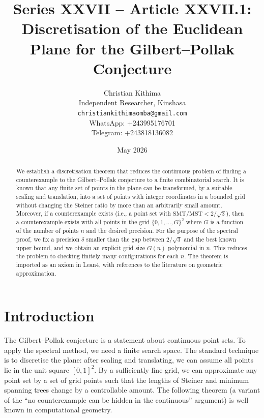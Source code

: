 \documentclass[11pt,a4paper]{article}
\title{Series XXVII – Article XXVII.1: Discretisation of the Euclidean Plane for the Gilbert–Pollak Conjecture}
\author{Christian Kithima \\
Independent Researcher, Kinshasa \\
\texttt{christiankithimaomba@gmail.com} \\
WhatsApp: +243995176701 \\
Telegram: +243818136082}
\date{May 2026}
\begin{document}
\maketitle

\begin{abstract}
We establish a discretisation theorem that reduces the continuous problem of finding a counterexample to the Gilbert–Pollak conjecture to a finite combinatorial search. It is known that any finite set of points in the plane can be transformed, by a suitable scaling and translation, into a set of points with integer coordinates in a bounded grid without changing the Steiner ratio by more than an arbitrarily small amount. Moreover, if a counterexample exists (i.e., a point set with \(\text{SMT}/\text{MST} < 2/\sqrt{3}\)), then a counterexample exists with all points in the grid \(\{0,1,\dots,G\}^2\) where \(G\) is a function of the number of points \(n\) and the desired precision. For the purpose of the spectral proof, we fix a precision \(\delta\) smaller than the gap between \(2/\sqrt{3}\) and the best known upper bound, and we obtain an explicit grid size \(G(n)\) polynomial in \(n\). This reduces the problem to checking finitely many configurations for each \(n\). The theorem is imported as an axiom in Lean4, with references to the literature on geometric approximation.
\end{abstract}

\tableofcontents

\section{Introduction}
The Gilbert–Pollak conjecture is a statement about continuous point sets. To apply the spectral method, we need a finite search space. The standard technique is to discretise the plane: after scaling and translating, we can assume all points lie in the unit square \([0,1]^2\). By a sufficiently fine grid, we can approximate any point set by a set of grid points such that the lengths of Steiner and minimum spanning trees change by a controllable amount. The following theorem (a variant of the “no counterexample can be hidden in the continuous” argument) is well known in computational geometry.
\end{document}
